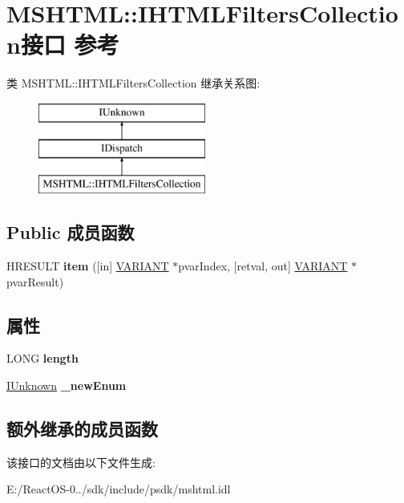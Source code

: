 \hypertarget{interface_m_s_h_t_m_l_1_1_i_h_t_m_l_filters_collection}{}\section{M\+S\+H\+T\+ML\+:\+:I\+H\+T\+M\+L\+Filters\+Collection接口 参考}
\label{interface_m_s_h_t_m_l_1_1_i_h_t_m_l_filters_collection}
类 M\+S\+H\+T\+ML\+:\+:I\+H\+T\+M\+L\+Filters\+Collection 继承关系图\+:\begin{figure}[H]
\begin{center}
\leavevmode
\includegraphics[height=3.000000cm]{interface_m_s_h_t_m_l_1_1_i_h_t_m_l_filters_collection}
\end{center}
\end{figure}
\subsection*{Public 成员函数}
\begin{DoxyCompactItemize}
\item 
\mbox{\label{interface_m_s_h_t_m_l_1_1_i_h_t_m_l_filters_collection_a8bbb2dac43a4fe9e2f1f6d18bcdb6c99}} 
H\+R\+E\+S\+U\+LT {\bfseries item} (\mbox{[}in\mbox{]} \hyperlink{structtag_v_a_r_i_a_n_t}{V\+A\+R\+I\+A\+NT} $\ast$pvar\+Index, \mbox{[}retval, out\mbox{]} \hyperlink{structtag_v_a_r_i_a_n_t}{V\+A\+R\+I\+A\+NT} $\ast$pvar\+Result)
\end{DoxyCompactItemize}
\subsection*{属性}
\begin{DoxyCompactItemize}
\item 
\mbox{\label{interface_m_s_h_t_m_l_1_1_i_h_t_m_l_filters_collection_a8a6a90b44707aa501651522a405aadef}} 
L\+O\+NG {\bfseries length}
\item 
\mbox{\label{interface_m_s_h_t_m_l_1_1_i_h_t_m_l_filters_collection_a3271ad8807199c816257f9d7e956c702}} 
\hyperlink{interface_i_unknown}{I\+Unknown} {\bfseries \+\_\+new\+Enum}
\end{DoxyCompactItemize}
\subsection*{额外继承的成员函数}


该接口的文档由以下文件生成\+:\begin{DoxyCompactItemize}
\item 
E\+:/\+React\+O\+S-\/0../sdk/include/psdk/mshtml.\+idl\end{DoxyCompactItemize}
